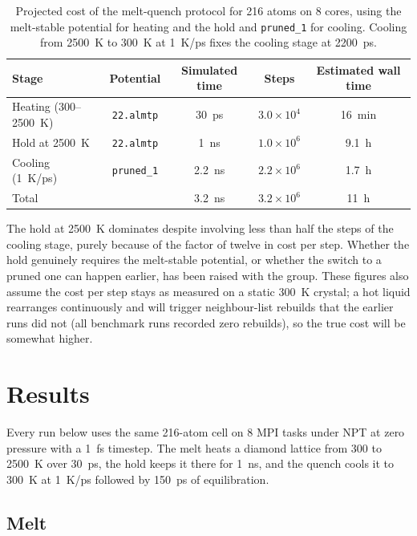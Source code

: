 \documentclass{article}
\begin{document}
\begin{table}[H]
\centering
\begin{tabular}{l|c|c|c|c}
\toprule
Stage & Potential & Simulated time & Steps & Estimated wall time \\
\midrule
Heating (300--2500~K) & \texttt{22.almtp} & 30~ps & $3.0 \times 10^4$ & 16~min \\
Hold at 2500~K & \texttt{22.almtp} & 1~ns & $1.0 \times 10^6$ & 9.1~h \\
Cooling (1~K/ps) & \texttt{pruned\_1} & 2.2~ns & $2.2 \times 10^6$ & 1.7~h \\
\midrule
Total & & 3.2~ns & $3.2 \times 10^6$ & 11~h \\
\bottomrule
\end{tabular}
\caption{Projected cost of the melt-quench protocol for 216 atoms on 8 cores, using the melt-stable potential for heating and the hold and \texttt{pruned\_1} for cooling. Cooling from 2500~K to 300~K at 1~K/ps fixes the cooling stage at 2200~ps.}
\label{tab:projected_cost}
\end{table}

The hold at 2500~K dominates despite involving less than half the steps of the cooling stage, purely because of the factor of twelve in cost per step. Whether the hold genuinely requires the melt-stable potential, or whether the switch to a pruned one can happen earlier, has been raised with the group. These figures also assume the cost per step stays as measured on a static 300~K crystal; a hot liquid rearranges continuously and will trigger neighbour-list rebuilds that the earlier runs did not (all benchmark runs recorded zero rebuilds), so the true cost will be somewhat higher.

\clearpage
\section{Results}

Every run below uses the same 216-atom cell on 8 MPI tasks under NPT at zero pressure with a 1~fs timestep. The melt heats a diamond lattice from 300 to 2500~K over 30~ps, the hold keeps it there for 1~ns, and the quench cools it to 300~K at 1~K/ps followed by 150~ps of equilibration.

\subsection{Melt}
\end{document}

